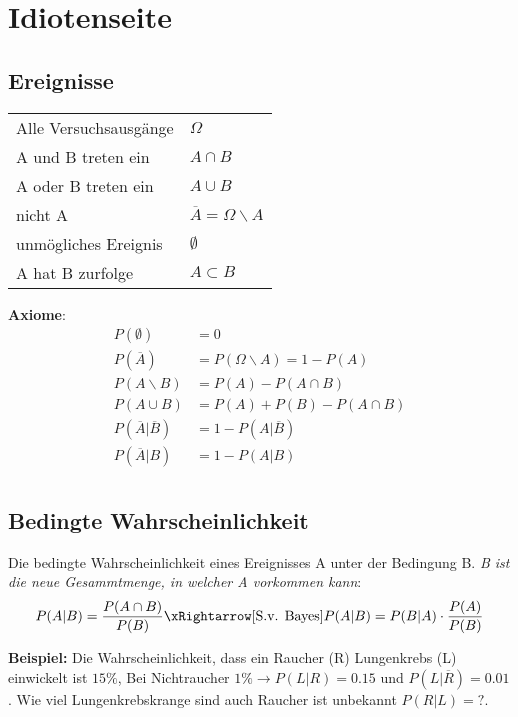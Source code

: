 \section{Idiotenseite}
\subsection{Ereignisse}
\begin{table}[H]
	\centering
	\begin{tabular}{l|l}
		Alle Versuchsausgänge & $\Omega$ \\
		A und B treten ein & $A \cap B$ \\
		A oder B treten ein & $A \cup B$ \\
		nicht A & $\overline{A} = \Omega \backslash A$ \\
		unmögliches Ereignis & $\emptyset$ \\
		A hat B zurfolge & $A \subset B$ \\
	\end{tabular}
\end{table}

\textbf{Axiome}:\\
\begin{align*}
	P(\emptyset) &= 0 \\
	P(\overline{A}) &= P(\Omega \backslash A) = 1 - P(A) \\
	P(A \backslash B) &= P(A) - P(A \cap B) \\
	P(A \cup B) &= P(A)  + P(B) - P(A \cap B) \\
	P(\overline{A} | \overline{B}) &= 1-P(A|\overline{B}) \\
	P(\overline{A} | B) &= 1-P(A|B) \\
\end{align*}

\subsection{Bedingte Wahrscheinlichkeit}
Die bedingte Wahrscheinlichkeit eines Ereignisses A unter der Bedingung B. \textit{B ist die neue Gesammtmenge, in welcher A vorkommen kann}:
\[
P(A|B) = \frac{P(A \cap B)}{P(B)} \xRightarrow[\text{S.v. Bayes}]{} P(A|B) = P(B|A)\cdot\frac{P(A)}{P(B)}
\]

\noindent\textbf{Beispiel:} Die Wahrscheinlichkeit, dass ein Raucher (R) Lungenkrebs (L) einwickelt ist $15\%$, Bei Nichtraucher $1\% \rightarrow P(L|R) = 0.15$ und $P(L|\overline{R}) = 0.01$. Wie viel Lungenkrebskrange sind auch Raucher ist unbekannt $P(R|L) = ?$.

